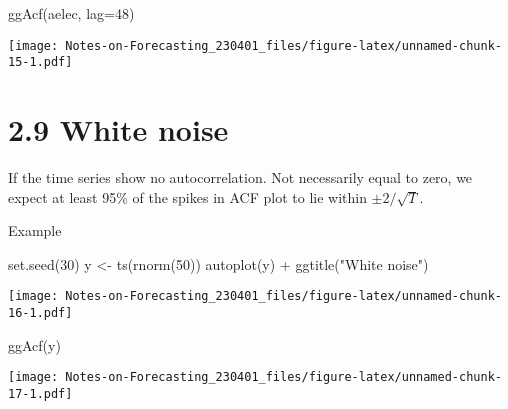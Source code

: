 \documentclass[
]{article}
\newenvironment{Shaded}{\begin{snugshade}}{\end{snugshade}}
\newcommand{\AttributeTok}[1]{\textcolor[rgb]{0.77,0.63,0.00}{#1}}
\newcommand{\DecValTok}[1]{\textcolor[rgb]{0.00,0.00,0.81}{#1}}
\newcommand{\FunctionTok}[1]{\textcolor[rgb]{0.00,0.00,0.00}{#1}}
\newcommand{\NormalTok}[1]{#1}
\newcommand{\OtherTok}[1]{\textcolor[rgb]{0.56,0.35,0.01}{#1}}
\newcommand{\SpecialCharTok}[1]{\textcolor[rgb]{0.00,0.00,0.00}{#1}}
\newcommand{\StringTok}[1]{\textcolor[rgb]{0.31,0.60,0.02}{#1}}
\begin{document}
\begin{Shaded}
\begin{Highlighting}[]
\FunctionTok{ggAcf}\NormalTok{(aelec, }\AttributeTok{lag=}\DecValTok{48}\NormalTok{)}
\end{Highlighting}
\end{Shaded}

\texttt{[image: Notes-on-Forecasting\_230401\_files/figure-latex/unnamed-chunk-15-1.pdf]}

\hypertarget{white-noise}{%
\section{2.9 White noise}\label{white-noise}}

If the time series show no autocorrelation. Not necessarily equal to
zero, we expect at least 95\% of the spikes in ACF plot to lie within
\(\pm2/\sqrt{T}\).

Example

\begin{Shaded}
\begin{Highlighting}[]
\FunctionTok{set.seed}\NormalTok{(}\DecValTok{30}\NormalTok{)}
\NormalTok{y }\OtherTok{\textless{}{-}} \FunctionTok{ts}\NormalTok{(}\FunctionTok{rnorm}\NormalTok{(}\DecValTok{50}\NormalTok{))}
\FunctionTok{autoplot}\NormalTok{(y) }\SpecialCharTok{+} \FunctionTok{ggtitle}\NormalTok{(}\StringTok{"White noise"}\NormalTok{)}
\end{Highlighting}
\end{Shaded}

\texttt{[image: Notes-on-Forecasting\_230401\_files/figure-latex/unnamed-chunk-16-1.pdf]}

\begin{Shaded}
\begin{Highlighting}[]
\FunctionTok{ggAcf}\NormalTok{(y)}
\end{Highlighting}
\end{Shaded}

\texttt{[image: Notes-on-Forecasting\_230401\_files/figure-latex/unnamed-chunk-17-1.pdf]}
\end{document}

